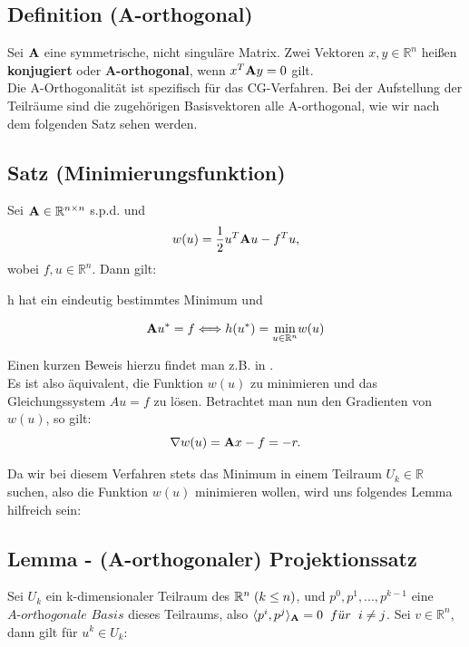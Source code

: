 \subsection{Definition (A-orthogonal)}\label{ss.A-orthogonal}
Sei ${\textbf{A}}$ eine symmetrische, nicht singuläre Matrix. Zwei Vektoren $x,y \in \mathbb{R}^{n}$ heißen \textbf{konjugiert} oder \textbf{A-orthogonal}, wenn $x^{T}{\textbf{A}}y = 0$ gilt.\\

Die A-Orthogonalität ist spezifisch für das CG-Verfahren. Bei der Aufstellung der Teilräume sind die zugehörigen Basisvektoren alle A-orthogonal, wie wir nach dem folgenden Satz sehen werden.

\subsection{Satz (Minimierungsfunktion)}
Sei ${\textbf{A}}\in\mathbb{R}^{n \times n}$ s.p.d. und
\begin{equation}
w(u) = \frac {1} {2} u^{T}{\textbf{A}}u - f^{T}u,
\end{equation}
wobei $f,u \in \mathbb{R}^{n}$. Dann gilt:
\begin{center}
h hat ein eindeutig bestimmtes Minimum und
\end{center}
\begin{equation}
{\textbf{A}}u^{*} = f \Longleftrightarrow h(u^{*}) = \underset{u\in\mathbb{R}^{n}}{\min} w(u)
\end{equation}

Einen kurzen Beweis hierzu findet man z.B. in \cite[S. 566]{DR08}.\\
Es ist also äquivalent, die Funktion $w(u)$ zu minimieren und das Gleichungssystem $Au = f$ zu lösen. Betrachtet man nun den Gradienten von $w(u)$, so gilt:
\begin{equation}
\nabla w(u) = {\textbf{A}}x - f = -r.
\end{equation}

Da wir bei diesem Verfahren stets das Minimum in einem Teilraum $U_{k} \in \mathbb{R}$ suchen, also die Funktion $w(u)$ minimieren wollen, wird uns folgendes Lemma hilfreich sein:

\subsection{Lemma - (A-orthogonaler) Projektionssatz}\label{s.Projektionssatz}

Sei $U_{k}$ ein k-dimensionaler Teilraum des $\mathbb{R}^{n} \hspace{1mm} (k \le n)$, und $p^{0}, p^{1},...,p^{k-1}$ eine $\textit{A-orthogonale Basis}$ dieses Teilraums, also $\langle p^{i}, p^{j} \rangle _{{\textbf{A}}} = 0 \hspace{2mm} f\ddot{u}r \hspace{2mm} i \ne j$. Sei $v \in \mathbb{R}^{n}$, dann gilt für $u^{k} \in U_{k}$:

